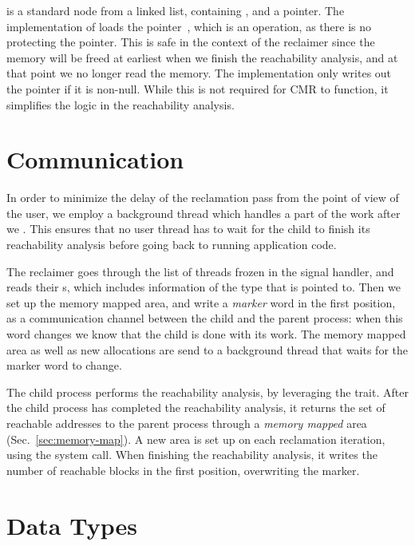  is a standard node from a linked list, containing , and a 
pointer. The implementation of  loads the  pointer~, which is
an  operation, as there is no  protecting the pointer. This is safe in the
context of the reclaimer since the memory will be freed at earliest when we finish the reachability
analysis, and at that point we no longer read the memory. The implementation only writes out the
pointer if it is non-null. While this is not required for CMR to function, it simplifies the logic
in the reachability analysis.




\section{Communication\label{sec:thread-communication}}

In order to minimize the delay of the reclamation pass from the point of view of the user, we
employ a background thread which handles a part of the work after we . This ensures that
no user thread has to wait for the child to finish its reachability analysis before going back to
running application code.

The reclaimer goes through the list of threads frozen in the signal handler, and reads their
s, which includes information of the type that is pointed to. Then we set up the memory
mapped area, and write a \emph{marker} word in the first position, as a communication channel
between the child and the parent process: when this word changes we know that the child is done
with its work. The memory mapped area as well as new allocations are send to a background thread
that waits for the marker word to change.

The child process performs the reachability analysis, by leveraging the  trait. After
the child process has completed the reachability analysis, it returns the set of reachable
addresses to the parent process through a \emph{memory mapped} area (Sec.~\ref{sec:memory-map}).  A
new area is set up on each reclamation iteration, using the  system call.  When
finishing the reachability analysis, it writes the number of reachable blocks in the first
position, overwriting the marker.





\section{Data Types\label{sec:data-types}}

